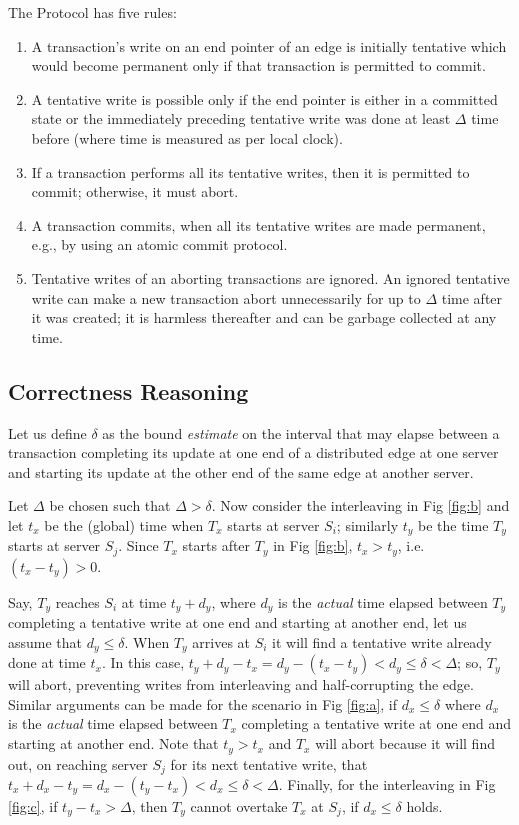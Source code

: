 The \tDelta Protocol has five rules:
\begin{enumerate}
\item A transaction's write on an end pointer of an edge is initially tentative which would become permanent only if that transaction is permitted to commit.
\item A tentative write is possible only if the end pointer is either in a committed state or the immediately preceding tentative write was done at least $\Delta$ time before (where time is measured as per local clock).
\item If a transaction performs all its tentative writes, then it is permitted to commit; otherwise, it must abort.
\item A transaction commits, when all its tentative writes are made permanent, e.g., by using an atomic commit protocol.
\item Tentative writes of an aborting transactions are ignored. An ignored tentative write can make a new transaction abort unnecessarily for up to $\Delta$ time after it was created; it is harmless thereafter and can be garbage collected at any time.
\end{enumerate}

\subsection{Correctness Reasoning}
\label{sec:corr-reas}

Let us define $\delta$ as the bound \emph{estimate} on the interval that may elapse between a transaction completing its update at one end of a distributed edge at one server and starting its update at the other end of the same edge at another server.

Let $\Delta$ be chosen such that $\Delta > \delta$.
Now consider the interleaving in Fig \ref{fig:b} and let $t_x$ be the (global) time when $T_x$ starts at server $S_i$; similarly $t_y$ be the time $T_y$ starts at server $S_j$.
Since $T_x$ starts after $T_y$ in Fig \ref{fig:b}, $t_x > t_y$, i.e. $(t_x - t_y) > 0$.

Say, $T_y$ reaches $S_i$ at time $t_y + d_y$, where $d_y$ is the \emph{actual} time elapsed between $T_y$ completing a tentative write at one end and starting at another end, let us assume that $d_y \leq \delta$.
When $T_y$ arrives at $S_i$ it will find a tentative write already done at time $t_x$.
In this case, $t_y + d_y - t_x = d_y - (t_x-t_y) < d_y \leq \delta < \Delta$; so, $T_y$ will abort, preventing writes from interleaving and half-corrupting the edge. Similar arguments can be made for the scenario in Fig \ref{fig:a}, if $d_x \leq \delta$ where $d_x$ is the \emph{actual} time elapsed between $T_x$ completing a tentative write at one end and starting at another end.
Note that $t_y > t_x$ and $T_x$ will abort because it will find out, on reaching server $S_j$ for its next tentative write, that $t_x +d_x - t_y = d_x - (t_y-t_x) < d_x \leq \delta < \Delta$. Finally, for the interleaving in Fig \ref{fig:c}, if $t_y - t_x > \Delta$, then $T_y$ cannot overtake $T_x$ at $S_j$, if $d_x \leq \delta$ holds.


